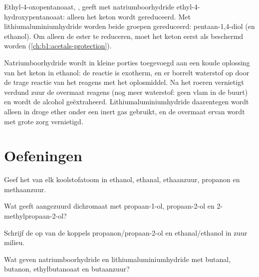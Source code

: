 \begin{example}\label{ex:b1:organic-redox:ketoester}
Ethyl-4-oxopentanoaat, , geeft met natriumboorhydride
ethyl-4-hydroxypentanoaat: alleen het keton wordt gereduceerd. Met
lithiumaluminiumhydride worden beide groepen gereduceerd:
pentaan-1,4-diol (en ethanol). Om alleen de ester te reduceren, moet het
keton eerst als  beschermd worden (\cref{ch:b1:acetals-protection}).
\end{example}

\begin{inthelab}
Natriumboorhydride wordt in kleine porties toegevoegd aan een koude
oplossing van het keton in ethanol: de reactie is exotherm, en er borrelt
waterstof op door de trage reactie van het reagens met het oplosmiddel.
Na het roeren vernietigt verdund zuur de overmaat reagens (nog meer
waterstof: geen vlam in de buurt) en wordt de alcohol geëxtraheerd.
Lithiumaluminiumhydride daarentegen wordt alleen in droge ether onder een
inert gas gebruikt, en de overmaat ervan wordt met grote zorg
vernietigd.
\end{inthelab}

\section{Oefeningen}

\begin{exercise}[$\star$]\label{exo:b1:organic-redox:1}
Geef het  van elk koolstofatoom in ethanol, ethanal,
ethaanzuur, propanon en methaanzuur.
\end{exercise}

\begin{exercise}[$\star$]\label{exo:b1:organic-redox:2}
Wat geeft aangezuurd dichromaat met propaan-1-ol, propaan-2-ol en
2-methylpropaan-2-ol?
\end{exercise}

\begin{exercise}[$\star$]\label{exo:b1:organic-redox:3}
Schrijf de  op van de koppels propanon/propaan-2-ol en
ethanal/ethanol in zuur milieu.
\end{exercise}

\begin{exercise}[$\star$]\label{exo:b1:organic-redox:4}
Wat geven natriumboorhydride en lithiumaluminiumhydride met butanal,
butanon, ethylbutanoaat en butaanzuur?
\end{exercise}

